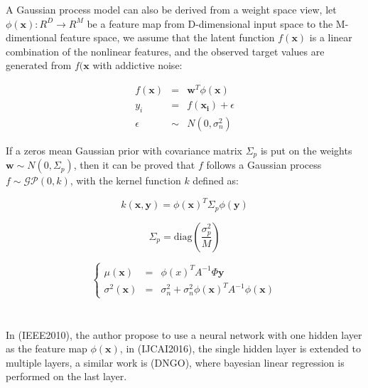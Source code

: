 A Gaussian process model can also be derived from a weight space view, let $\phi(\bm{x}): R^D \rightarrow R^M$ be a feature map from D-dimensional input space to the M-dimentional feature space, we assume that the latent function $f(\bm{x})$ is a linear combination of the nonlinear features, and the observed target values are generated from $f(\bm{x}$ with addictive noise:

\begin{equation}
    \label{eq:weightspace}
    \begin{array}{lll}
        f(\bm{x}) &=&    \bm{w}^T \phi(\bm{x})   \\
        y_i       &=&    f(\bm{x_i}) + \epsilon  \\
        \epsilon  &\sim& N(0, \sigma_n^2)
    \end{array}
\end{equation}

If a zeros mean Gaussian prior with covariance matrix $\Sigma_p$ is put on the weights $\bm{w} \sim N(0, \Sigma_p)$, then it can be proved \cite{GPML} that $f$ follows a Gaussian process $f \sim \mathcal{GP}(0, k)$, with the kernel function $k$ defined as:

\begin{equation}
    \label{eq:kernel_from_weight}
    k(\bm{x}, \bm{y}) = \phi(\bm{x})^T \Sigma_p \phi(\bm{y})
\end{equation}

\begin{equation}
    \Sigma_p = \mathrm{diag}(\frac{\sigma_p^2}{M})
\end{equation}

\begin{equation}
    \left\{
        \begin{array}{lll}
            \mu(\bm{x})      &=& \phi(x)^T A^{-1} \Phi \bm{y} \\
            \sigma^2(\bm{x}) &=& \sigma_n^2 + \sigma_n^2 \phi(\bm{x})^T A^{-1} \phi(\bm{x})
        \end{array}
    \right.
\end{equation}

\begin{equation}
\end{equation}

\begin{equation}
\end{equation}

In (IEEE2010), the author propose to use a neural network with one hidden layer as the feature map $\phi(\bm{x})$, in (IJCAI2016), the single hidden layer is extended to multiple layers, a similar work is (DNGO), where bayesian linear regression is performed on the last layer. 


